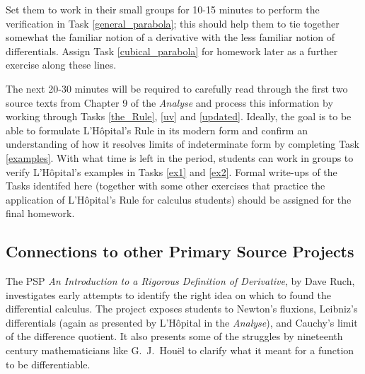 \documentclass[11pt]{article}
\begin{document}
Set them to work in their small groups for 10-15 minutes to perform the verification in Task \ref{general_parabola}; this should help them to tie together somewhat the familiar notion of a derivative with the less familiar notion of differentials. Assign Task \ref{cubical_parabola} for homework later as a further exercise along these lines.

The next 20-30 minutes will be required to carefully read through the first two source texts from Chapter 9 of the \emph{Analyse} and process this information by working through Tasks \ref{the_Rule}, \ref{uv} and \ref{updated}. Ideally, the goal is to be able to formulate L'H\^opital's Rule in its modern form and confirm an understanding of how it resolves limits of indeterminate form by completing Task \ref{examples}. With what time is left in the period, students can work in groups to verify L'H\^opital's examples in Tasks \ref{ex1} and \ref{ex2}. Formal write-ups of the Tasks identifed here (together with some other exercises that practice the application of L'H\^opital's Rule for calculus students) should be assigned for the final homework.

 \vspace*{-6pt}
\subsection*{Connections to other Primary Source Projects}

 \vspace*{-3pt}
The PSP \emph{An Introduction to a Rigorous Definition of Derivative}, by Dave Ruch, investigates early attempts to identify the right idea on which to found the differential calculus. The project exposes students to Newton's fluxions, Leibniz's differentials (again as presented by L'H\^opital in the \emph{Analyse}), and Cauchy's limit of the difference quotient. It also presents some of the struggles by nineteenth century mathematicians like G.~J.~Hou{\"e}l to clarify what it meant for a function to be differentiable.

\end{document}
